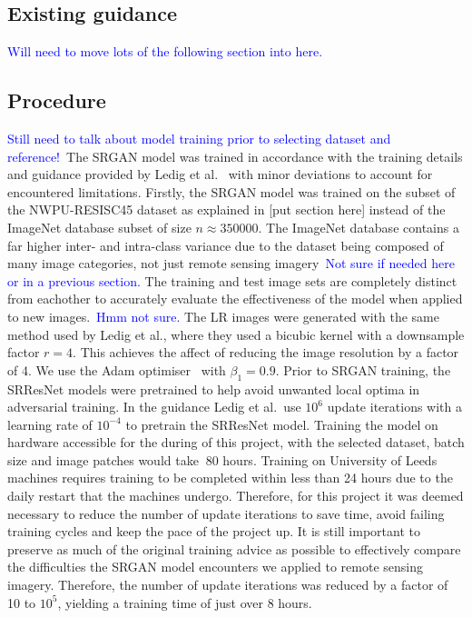 \subsection{Existing guidance}
\textcolor{blue}{Will need to move lots of the following section into here.}

\subsection{Procedure}
\textcolor{blue}{Still need to talk about model training prior to selecting dataset and reference!}\ The SRGAN model was trained in accordance with the training details and guidance provided by Ledig et al.~\cite{srgan} with minor deviations to account for encountered limitations. Firstly, the SRGAN model was trained on the subset of the NWPU-RESISC45 dataset as explained in [put section here] instead of the ImageNet database subset of size $n \approx 350000$. The ImageNet database contains a far higher inter- and intra-class variance due to the dataset being composed of many image categories, not just remote sensing imagery\ \textcolor{blue}{Not sure if needed here or in a previous section.} The training and test image sets are completely distinct from eachother to accurately evaluate the effectiveness of the model when applied to new images.\ \textcolor{blue}{Hmm not sure.} The LR images were generated with the same method used by Ledig et al., where they used a bicubic kernel with a downsample factor $r=4$. This achieves the affect of reducing the image resolution by a factor of 4. We use the Adam optimiser~\cite{ref} with $\beta_1 = 0.9$. Prior to SRGAN training, the SRResNet models were pretrained to help avoid unwanted local optima in adversarial training. In the guidance Ledig et al.\ use $10^6$ update iterations with a learning rate of $10^{-4}$ to pretrain the SRResNet model. Training the model on hardware accessible for the during of this project, with the selected dataset, batch size and image patches would take $~80$ hours. Training on University of Leeds machines requires training to be completed within less than 24 hours due to the daily restart that the machines undergo. Therefore, for this project it was deemed necessary to reduce the number of update iterations to save time, avoid failing training cycles and keep the pace of the project up. It is still important to preserve as much of the original training advice as possible to effectively compare the difficulties the SRGAN model encounters we applied to remote sensing imagery. Therefore, the number of update iterations was reduced by a factor of 10 to $10^5$, yielding a training time of just over 8 hours.

